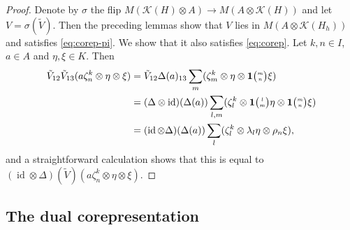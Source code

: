 \documentclass[11pt]{article}
\DeclareMathOperator{\id}{id}
\newcommand{\Grt}[3]{#1{\tiny {\begin{pmatrix} #2\\#3\end{pmatrix}}}}
\newcommand{\UnitC}[2]{\Grt{\mathbf{1}}{#1}{#2}}
\theoremstyle{definition}
\numberwithin{equation}{section}
\begin{document}
 \begin{proof}
   Denote by $\sigma$ the flip $ M(\mathcal{K}(H) \otimes A) \to M(A
   \otimes \mathcal{K}(H))$ and let $V=\sigma(\tilde V)$. Then the
   preceding lemmas show that $V$ lies in $M(A\otimes
   \mathcal{K}(H_{h}))$ and satisfies \eqref{eq:corep-pi}. We show
   that it also satisfies \eqref{eq:corep}. Let $k,n\in I$, $a\in A$ and $\eta,\xi \in K$. Then
 \begin{align*}
\tilde V_{12}\tilde V_{13}(a\zeta^{k}_{n} \otimes \eta\otimes \xi) &=
\tilde V_{12} \Delta(a)_{13}\sum_{m}(\zeta^{k}_{m} \otimes \eta \otimes \UnitC{m}{n}\xi) \\
&= (\Delta \otimes \id)(\Delta(a)) \sum_{l,m} (\zeta^{k}_{l} \otimes \UnitC{l}{m}\eta \otimes
\UnitC{m}{n}\xi)  \\
&= (\id \otimes \Delta)(\Delta(a))  \sum_{l} (\zeta^{k}_{l} \otimes \lambda_{l}\eta \otimes
\rho_{n}\xi),
\end{align*}
and a straightforward calculation shows that this is equal to $(\id \otimes \Delta)(\tilde
V)(a\zeta^{k}_{n} \otimes \eta\otimes \xi)$.
 \end{proof}
\subsection{The dual corepresentation}
\end{document}
